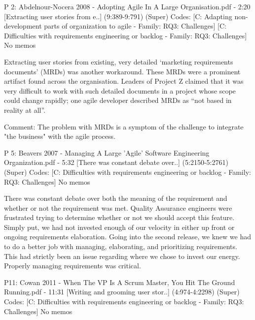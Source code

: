 \documentclass[preprint,authoryear,12pt]{elsarticle}
\begin{document}
P 2: Abdelnour-Nocera 2008 - Adopting Agile In A Large Organisation.pdf - 2:20 [Extracting user stories from e..]  (9:389-9:791)   (Super)
Codes:	[C: Adapting non-development parts of organization to agile - Family: RQ3: Challenges] [C: Difficulties with requirements engineering or backlog - Family: RQ3: Challenges] 
No memos

Extracting user stories from existing, very detailed ‘marketing requirements 
documents’ (MRDs) was another workaround. These MRDs were a prominent artifact 
found across the organisation. Leaders of Project Z claimed that it was very difficult 
to work with such detailed documents in a project whose scope could change rapidly; 
one agile developer described MRDs as “not based in reality at all”.

Comment:
The problem with MRDs is a symptom of the challenge to integrate "the business" with the agile process.

P 5: Beavers 2007 - Managing A Large 'Agile' Software Engineering Organization.pdf - 5:32 [There was constant debate over..]  (5:2150-5:2761)   (Super)
Codes:	[C: Difficulties with requirements engineering or backlog - Family: RQ3: Challenges] 
No memos

There was 
constant debate over both the meaning of the 
requirement and whether or not the requirement was 
met.  Quality Assurance engineers were frustrated 
trying to determine whether or not we should accept 
this feature.  Simply put, we had not invested enough 
of our velocity in either up front or ongoing 
requirements elaboration.
Going into the second release, we knew we had to 
do a better job with managing, elaborating, and 
prioritizing requirements.  This had strictly been an 
issue regarding where we chose to invest our energy.  
Properly managing requirements was critical.


P11: Cowan 2011 - When The VP Is A Scrum Master, You Hit The Ground Running.pdf - 11:31 [Writing and grooming user stor..]  (4:974-4:2298)   (Super)
Codes:	[C: Difficulties with requirements engineering or backlog - Family: RQ3: Challenges] 
No memos
\end{document}
